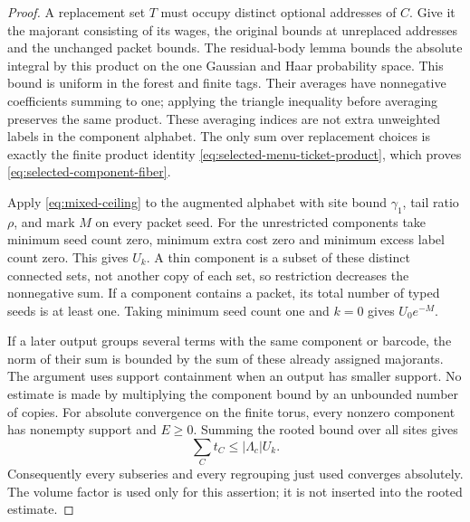 \begin{proof}
A replacement set $T$ must occupy distinct optional addresses of $C$.
Give it the majorant consisting of its wages, the original bounds at
unreplaced addresses and the unchanged packet bounds. The residual-body
lemma bounds the absolute integral by this product on the one Gaussian
and Haar probability space. This bound is uniform in the forest and
finite tags. Their averages have nonnegative coefficients summing to
one; applying the triangle inequality before averaging preserves the
same product. These averaging indices are not extra unweighted labels
in the component alphabet. The only sum over replacement choices is
exactly the finite product identity
\eqref{eq:selected-menu-ticket-product}, which proves
\eqref{eq:selected-component-fiber}.

Apply \eqref{eq:mixed-ceiling} to the augmented alphabet with site
bound $\gamma_1$, tail ratio $\rho$, and mark $M$ on every packet
seed. For the unrestricted components take minimum seed count zero,
minimum extra cost zero and minimum excess label count zero. This
gives $U_k$. A thin component is a subset of these distinct connected
sets, not another copy of each set, so restriction decreases the
nonnegative sum. If a component contains a packet, its total number
of typed seeds is at least one. Taking minimum seed count one and
$k=0$ gives $U_0e^{-M}$.

If a later output groups several terms with the same component or
barcode, the norm of their sum is bounded by the sum of these already
assigned majorants. The argument uses support containment when an
output has smaller support. No estimate is made by multiplying the
component bound by an unbounded number of copies. For absolute
convergence on the finite torus, every nonzero component has nonempty
support and $E\ge0$. Summing the rooted bound over all sites gives
\[
             \sum_C t_C\le |\Lambda_c|U_k.
\]
Consequently every subseries and every regrouping just used converges
absolutely. The volume factor is used only for this assertion; it is
not inserted into the rooted estimate.
\end{proof}


